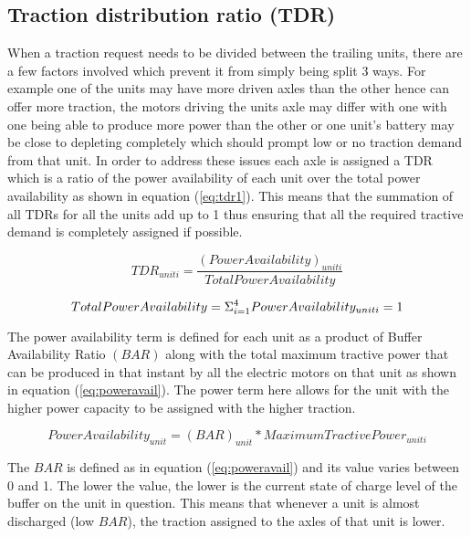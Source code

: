 \documentclass[MastersThesis.tex]{subfiles}
\begin{document}
\subsection{Traction distribution ratio (TDR)} \label{sec:tdr}
When a traction request needs to be divided between the trailing units, there are a few factors involved which prevent it from simply being split 3 ways. For example one of the units may have more driven axles than the other hence can offer more traction, the motors driving the units axle may differ with one with one being able to produce more power than the other or one unit’s battery may be close to depleting completely which should prompt low or no traction demand from that unit. In order to address these issues each axle is assigned a TDR which is a ratio of the power availability of each unit over the total power availability as shown in equation (\ref{eq:tdr1}). This means that the summation of all TDRs for all the units add up to 1 thus ensuring that all the required tractive demand is completely assigned if possible. 

\begin{equation} \label{eq:tdr1}
TDR_{unit i}=\frac{(Power Availability)_{unit i}}{Total Power Availability}
\end{equation}
 
\begin{equation} \label{eq:tdr2}
Total Power Availability = \Sigma_{i=1}^{4} Power Availability_{unit i} = 1\\
\end{equation}

The power availability term is defined for each unit as a product of Buffer Availability Ratio $(BAR)$ along with the total maximum tractive power that can be produced in that instant by all the electric motors on that unit as shown in equation (\ref{eq:poweravail}). The power term here allows for the unit with the higher power capacity to be assigned with the higher traction.

\begin{equation} \label{eq:poweravail}
Power Availability_{unit} = (BAR)_{unit} * Maximum Tractive Power_{unit i}
\end{equation}
   
The $BAR$ is defined as in equation (\ref{eq:poweravail}) and its value varies between 0 and 1. The lower the value, the lower is the current state of charge level of the buffer on the unit in question. This means that whenever a unit is almost discharged (low $BAR$), the traction assigned to the axles of that unit is lower. 
\end{document}

